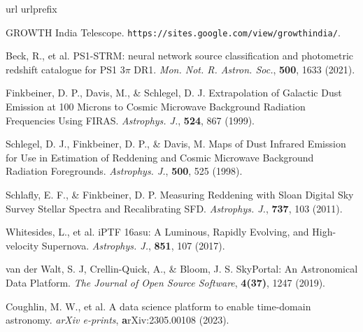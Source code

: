 \documentclass{nature_plusfigure}
\newcommand{\mn}{{Mon. Not. R. Astron. Soc.}}
\newcommand{\mnras}{\mn}
\newcommand{\apj}{{Astrophys. J.}}
\begin{document}
\begin{methods}
\vspace{1in}
%
%

\begin{thebibliography}{10}
\expandafter\ifx\csname url\endcsname\relax
  \def\url#1{\texttt{#1}}\fi
\expandafter\ifx\csname urlprefix\endcsname\relax\def\urlprefix{URL }\fi
\providecommand{\bibinfo}[2]{#2}
\providecommand{\eprint}[2][]{\url{#2}}
\makeatletter
\addtocounter{\@listctr}{44}
\makeatother


\bibinfo{title}{{GROWTH India Telescope}}.
\newblock
  \bibinfo{howpublished}{\url{https://sites.google.com/view/growthindia/}}.


 Beck, R., et al. PS1-STRM: neural network source classification and photometric redshift catalogue for PS1 3$\pi$ DR1. \emph{\mnras}, \textbf{500}, 1633 (2021). 

 Finkbeiner, D. P., Davis, M., \& Schlegel, D. J. Extrapolation of Galactic Dust Emission at 100 Microns to Cosmic Microwave Background Radiation Frequencies Using FIRAS. \emph{\apj}, \textbf{524}, 867 (1999). 
 
 Schlegel, D. J., Finkbeiner, D. P., \& Davis, M. Maps of Dust Infrared Emission for Use in Estimation of Reddening and Cosmic Microwave Background Radiation Foregrounds. \emph{\apj}, \textbf{500}, 525 (1998). 

 Schlafly, E. F., \& Finkbeiner, D. P. Measuring Reddening with Sloan Digital Sky Survey Stellar Spectra and Recalibrating SFD. \emph{\apj}, \textbf{737}, 103 (2011). 
 
 Whitesides, L., et al. iPTF 16asu: A Luminous, Rapidly Evolving, and High-velocity Supernova. \emph{\apj}, \textbf{851}, 107 (2017). 

 van der Walt, S. J, Crellin-Quick, A., \& Bloom, J. S. SkyPortal: An Astronomical Data Platform. \emph{The Journal of Open Source Software}, \textbf{4(37)}, 1247 (2019). 

 Coughlin, M. W., et al. A data science platform to enable time-domain astronomy. \emph{arXiv e-prints}, \textbf arXiv:2305.00108 (2023). 


\end{thebibliography}
\end{methods}
\end{document}
